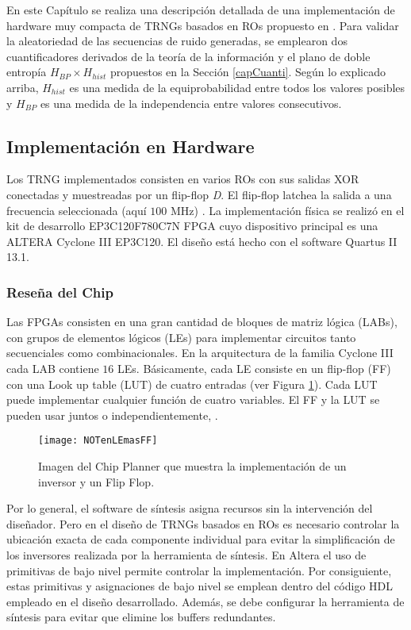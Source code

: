 En este Capítulo se realiza una descripción detallada de una implementación de hardware muy compacta de {TRNG}s basados en {RO}s propuesto en \cite{Wold2009}.
Para validar la aleatoriedad de las secuencias de ruido generadas, se emplearon dos cuantificadores derivados de la teoría de la información y el plano de doble entropía $H_{BP} \times H_{hist}$ propuestos en la Sección \ref{capCuanti}.
Según lo explicado arriba, $H_{hist}$ es una medida de la equiprobabilidad entre todos los valores posibles y $H_{BP}$ es una medida de la independencia entre valores consecutivos.

\subsection{Implementación en Hardware}

Los {TRNG} implementados consisten en varios {RO}s con sus salidas XOR conectadas y muestreadas por un flip-flop \emph{D}.
El flip-flop latchea la salida a una frecuencia seleccionada (aquí $ 100 $ MHz) \cite{Wold2009}.
La implementación física se realizó en el kit de desarrollo {EP3C120F780C7N} {FPGA} cuyo dispositivo principal es una  {ALTERA} {Cyclone} III {EP3C120}.
El diseño está hecho con el software {Quartus} II 13.1.

\subsubsection{Reseña del Chip}

Las {FPGA}s consisten en una gran cantidad de bloques de matriz lógica ({LAB}s), con grupos de elementos lógicos ({LE}s) para implementar circuitos tanto secuenciales como combinacionales.
En la arquitectura de la familia {Cyclone} III cada {LAB} contiene $16$ {LE}s.
Básicamente, cada {LE} consiste en un flip-flop ({FF}) con una Look up table ({LUT}) de cuatro entradas (ver Figura \ref{fig:LE}).
Cada {LUT} puede implementar cualquier función de cuatro variables.
El {FF} y la {LUT} se pueden usar juntos o independientemente, \cite{Altera}.
%
\begin{figure}
\begin{center}
\texttt{[image: NOTenLEmasFF]}
\caption{Imagen del Chip Planner que muestra la implementación de un inversor y un Flip Flop.} \label{fig:LE}
\end{center}
\end{figure}

Por lo general, el software de síntesis asigna recursos sin la intervención del diseñador.
Pero en el diseño de {TRNG}s basados en {RO}s es necesario controlar la ubicación exacta de cada componente individual  para evitar la simplificación de los inversores realizada por la herramienta de síntesis.
En {Altera} el uso de primitivas de bajo nivel permite controlar la implementación.
Por consiguiente, estas primitivas y asignaciones de bajo nivel se emplean dentro del código {HDL} empleado en el diseño desarrollado.
Además, se debe configurar la herramienta de síntesis para evitar que elimine los buffers redundantes.

